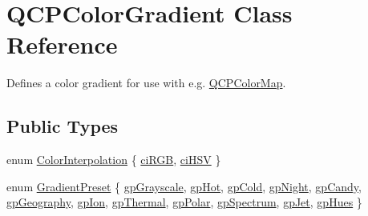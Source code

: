 \hypertarget{classQCPColorGradient}{\section{\-Q\-C\-P\-Color\-Gradient \-Class \-Reference}
\label{classQCPColorGradient}
}


\-Defines a color gradient for use with e.\-g. \hyperlink{classQCPColorMap}{\-Q\-C\-P\-Color\-Map}.  


\subsection*{\-Public \-Types}
\begin{DoxyCompactItemize}
\item 
enum \hyperlink{classQCPColorGradient_ac5dca17cc24336e6ca176610e7f77fc1}{\-Color\-Interpolation} \{ \hyperlink{classQCPColorGradient_ac5dca17cc24336e6ca176610e7f77fc1a5e30f725c9cfe93999e268a9f92afbe7}{ci\-R\-G\-B}, 
\hyperlink{classQCPColorGradient_ac5dca17cc24336e6ca176610e7f77fc1af14ae62fcae11ecc07234eeaec5856cb}{ci\-H\-S\-V}
 \}
\item 
enum \hyperlink{classQCPColorGradient_aed6569828fee337023670272910c9072}{\-Gradient\-Preset} \{ \*
\hyperlink{classQCPColorGradient_aed6569828fee337023670272910c9072add11ae369a86f3b1b6205ec72e5021fb}{gp\-Grayscale}, 
\hyperlink{classQCPColorGradient_aed6569828fee337023670272910c9072a4f42e534cf6cff5a29a5388094d099b5}{gp\-Hot}, 
\hyperlink{classQCPColorGradient_aed6569828fee337023670272910c9072aec8c001f62c0d5cb853db5fd85309557}{gp\-Cold}, 
\hyperlink{classQCPColorGradient_aed6569828fee337023670272910c9072a1bb89351b6def7d220973443fe059c62}{gp\-Night}, 
\*
\hyperlink{classQCPColorGradient_aed6569828fee337023670272910c9072a9e72663bf6b94b65945f7843f24e0721}{gp\-Candy}, 
\hyperlink{classQCPColorGradient_aed6569828fee337023670272910c9072a382f0b07cec1a59d8a533438aea815d2}{gp\-Geography}, 
\hyperlink{classQCPColorGradient_aed6569828fee337023670272910c9072a4297f4f9e212a819cd65e8e34567182b}{gp\-Ion}, 
\hyperlink{classQCPColorGradient_aed6569828fee337023670272910c9072af1676b129f9f458ace453f280c731cf7}{gp\-Thermal}, 
\*
\hyperlink{classQCPColorGradient_aed6569828fee337023670272910c9072ab7414ce4e36dc3e82e0132a7f0f41b52}{gp\-Polar}, 
\hyperlink{classQCPColorGradient_aed6569828fee337023670272910c9072ad63adc100ef46f6b4a8a6deacec4642f}{gp\-Spectrum}, 
\hyperlink{classQCPColorGradient_aed6569828fee337023670272910c9072a5f8a9e67b64c17ddfe4f069fe2b9fb02}{gp\-Jet}, 
\hyperlink{classQCPColorGradient_aed6569828fee337023670272910c9072a30efe58407acfb67939032f70213a130}{gp\-Hues}
 \}
\end{DoxyCompactItemize}
